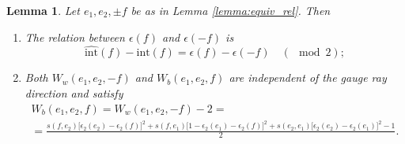 \documentclass[11pt]{amsart}
\theoremstyle{plain}
\numberwithin{equation}{section}
\newtheorem{lemma}[theorem]{Lemma}
\begin{document}
\begin{lemma}\label{lem:indip}
Let $e_1,e_2,\pm f$ be as in Lemma \ref{lemma:equiv_rel}. Then
\begin{enumerate}
\item The relation between $\epsilon(f)$ and $\epsilon(-f)$ is
\begin{equation}\label{eq:region_bw_rel}
\widehat{\mbox{int}}(f) - \mbox{int}(f) =\epsilon(f) -\epsilon(-f) \quad
(\!\!\!\!\!\!\mod 2);
\end{equation}
\item Both $W_w(e_1,e_2,-f)$ and $W_b(e_1,e_2,f)$ are independent of the gauge ray direction and satisfy
\begin{equation}\label{eq:wind_bw_rel}
\begin{array}{l}
W_b(e_1,e_2,f) = W_w(e_1,e_2,-f) -2 =\\
= \frac{s(f,e_2)\big[\epsilon_2(e_2)-\epsilon_2(f)\big]^2 + s(f,e_1)\big[1-\epsilon_2(e_1)-\epsilon_2(f)\big]^2 + s(e_2,e_1) \big[\epsilon_2(e_2)-\epsilon_2(e_1)\big]^2 -1}{2}.
\end{array}
\end{equation}
\end{enumerate}
\end{lemma}
\end{document}
